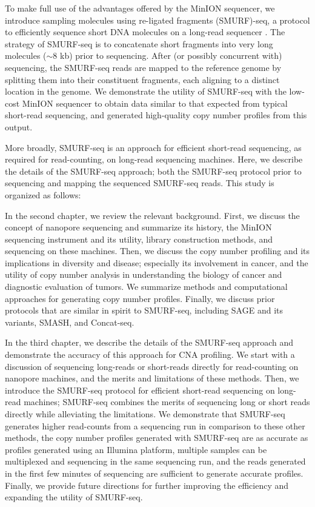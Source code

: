 To make full use of the advantages offered by the MinION sequencer, we
introduce sampling molecules using re-ligated fragments (SMURF)-seq, a
protocol to efficiently sequence short DNA molecules on a long-read
sequencer \citep{prabakar2019smurf}. The strategy of SMURF-seq is to
concatenate short fragments into very long molecules ($\sim$8 kb) prior
to sequencing. After (or possibly concurrent with) sequencing, the
SMURF-seq reads are mapped to the reference genome by splitting them
into their constituent fragments, each aligning to a distinct location
in the genome.
%
We demonstrate the utility of SMURF-seq with the low-cost MinION
sequencer to obtain data similar to that expected from typical
short-read sequencing, and generated high-quality copy number profiles
from this output.

More broadly, SMURF-seq is an approach for efficient short-read
sequencing, as required for read-counting, on long-read sequencing
machines. Here, we describe the details of the SMURF-seq approach; both
the SMURF-seq protocol prior to sequencing and mapping the sequenced
SMURF-seq reads. This study is organized as follows:

In the second chapter, we review the relevant background.  First, we
discuss the concept of nanopore sequencing and summarize its history,
the MinION sequencing instrument and its utility, library construction
methods, and sequencing on these machines.
%
Then, we discuss the copy number profiling and its implications in
diversity and disease; especially its involvement in cancer, and the
utility of copy number analysis in understanding the biology of cancer
and diagnostic evaluation of tumors. We summarize methods and
computational approaches for generating copy number profiles.
%
Finally, we discuss prior protocols that are similar in spirit to
SMURF-seq, including SAGE and its variants, SMASH, and Concat-seq.

In the third chapter, we describe the details of the SMURF-seq approach
and demonstrate the accuracy of this approach for CNA profiling.  We
start with a discussion of sequencing long-reads or short-reads directly
for read-counting on nanopore machines, and the merits and limitations
of these methods.
%
Then, we introduce the SMURF-seq protocol for efficient short-read
sequencing on long-read machines; SMURF-seq combines the merits of
sequencing long or short reads directly while alleviating the
limitations.
%
We demonstrate that SMURF-seq generates higher read-counts from a
sequencing run in comparison to these other methods, the copy number
profiles generated with SMURF-seq are as accurate as profiles generated
using an Illumina platform, multiple samples can be multiplexed and
sequencing in the same sequencing run, and the reads generated in the
first few minutes of sequencing are sufficient to generate accurate
profiles.
%
Finally, we provide future directions for further improving the
efficiency and expanding the utility of SMURF-seq.

